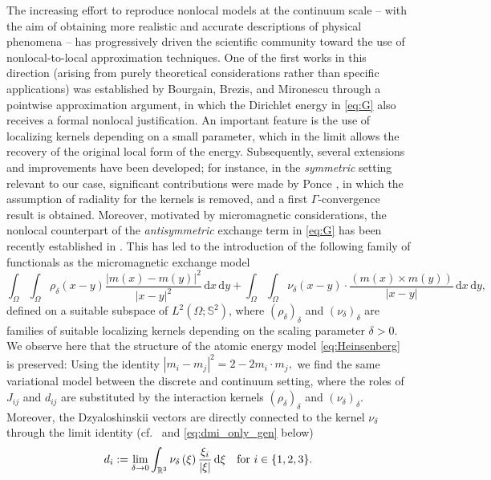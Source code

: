 \documentclass[reqno,11pt]{amsart}
\numberwithin{equation}{section}
\theoremstyle{thmlemcorr}
\numberwithin{theorem}{section}
\theoremstyle{thmlemcorr*}
\theoremstyle{defi}
\theoremstyle{remexample}
\theoremstyle{ass}
\newcommand{\R}{\mathbb{R}}
\renewcommand{\S}{\mathbb{S}}
\newcommand{\dd}{\,\mathrm{d}}
\DeclarePairedDelimiter{\abs}{\lvert}{\rvert}
\newcommand{\1}{\mathds{1}}
\begin{document}
The increasing effort to reproduce nonlocal models at the continuum scale -- with the aim of obtaining more realistic and accurate descriptions of physical phenomena -- has progressively driven the scientific community toward the use of nonlocal-to-local approximation techniques. One of the first works in this direction (arising from purely theoretical considerations rather than specific applications) was established by Bourgain, Brezis, and Mironescu \cite{BBM01} through a pointwise approximation argument, in which the  Dirichlet energy in \eqref{eq:G} also receives a formal nonlocal justification. An important feature is the use of localizing kernels depending on a small parameter, which in the limit allows the recovery of the original local form of the energy. Subsequently, several extensions and improvements have been developed; for instance, in the \textit{symmetric} setting relevant to our case, significant contributions were made by Ponce \cite{Pon04, Pon04b}, in which the assumption of radiality for the kernels is removed, and a first $\Gamma$-convergence result is obtained. Moreover, motivated by micromagnetic considerations, the nonlocal counterpart of the \textit{antisymmetric} exchange term in \eqref{eq:G} has been recently established in \cite{DDG24}. This has led to the introduction of the following family of functionals as the micromagnetic exchange model
\begin{equation}\label{eq:localization}
 \int_{\Omega}\int_{\Omega} \rho_{\delta} 
     (x - y)  \frac{|m (x) - m (y) |^2}{|x - y|^2}\dd x \dd
     y + \int_{\Omega}\int_{\Omega} \nu_{\delta} 
     (x - y) \cdot \frac{(m (x) \times m (y))}{|x - y|} \dd x
     \dd y, 
\end{equation}
defined on a suitable subspace of $L^2 (\Omega ; \S^2)$, where $\left( \rho_{\delta}
\right)_{\delta}$ and $(\nu_{\delta})_{\delta }$ are families of suitable localizing kernels depending on the scaling parameter $\delta > 0.$ We observe here that the structure of the atomic energy model \eqref{eq:Heinsenberg} is preserved: Using the identity $|m_i - m_j|^2 = 2 - 2m_i \cdot m_j,$ we find the same variational model between the discrete and continuum setting, where the roles of $J_{ij}$ and $d_{ij}$ are substituted by the interaction kernels $\left( \rho_{\delta}
\right)_{\delta}$ and $(\nu_{\delta})_{\delta }$. Moreover, the Dzyaloshinskii vectors are directly connected to the kernel $\nu_\delta$ through the limit identity (cf.\ \cite{DDG24} and \eqref{eq:dmi_only_gen} below)
    \begin{equation*}
    d_i
    := \lim_{\delta \to 0} \int_{\R^3} \nu_{\delta} \left(\xi\right)\frac{\xi_i}{\abs{\xi}}\dd \xi \quad \text{for $i\in \{1,2,3\}$.}
    \end{equation*} 
\end{document}
